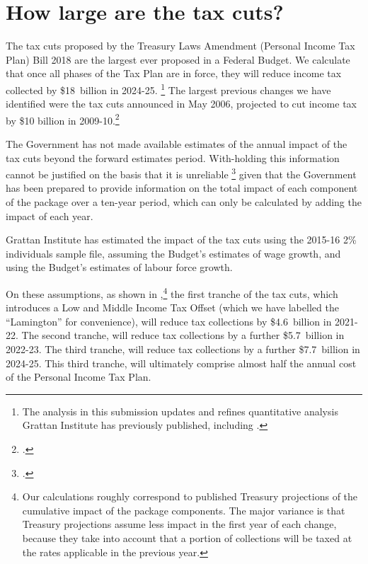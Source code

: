 \documentclass[submission]{grattan}\usepackage[]{graphicx}\usepackage[]{color}
\begin{document}
\chapter{How large are the tax cuts?}\label{chap:how-large-are-the-tax-cuts}

The tax cuts proposed by the Treasury Laws Amendment (Personal Income Tax Plan) Bill 2018 are the largest ever proposed in a Federal Budget. We calculate that once all phases of the Tax Plan are in force, they will reduce income tax collected by \$18~billion in 2024-25.%
  \footnote{The analysis in this submission updates and refines quantitative analysis Grattan Institute has previously published, including \textcite{DaleyWood2018}.}
The largest previous changes we have identified were the tax cuts announced in May 2006, projected to cut income tax by \$10 billion in 2009-10.\footcite[][23]{Treasury2006}

The Government has not made available estimates of the annual impact of the tax cuts beyond the forward estimates period. With-holding this information cannot be justified on the basis that it is unreliable%
  \footcite{Murphy2018}
given that the Government has been prepared to provide information on the total impact of each component of the package over a ten-year period, which can only be calculated by adding the impact of each year.

Grattan Institute has estimated the impact of the tax cuts using the 2015-16 2\% individuals sample file, assuming the Budget's estimates of wage growth, and using the Budget's estimates of labour force growth.

On these assumptions, as shown in  ,\footnote{Our calculations roughly correspond to published Treasury projections of the cumulative impact of the package components. The major variance is that Treasury projections assume less impact in the first year of each change, because they take into account that a portion of collections will be taxed at the rates applicable in the previous year.}
the first tranche of the tax cuts, which introduces a Low and Middle Income Tax Offset (which we have labelled the ``Lamington'' for convenience), will reduce tax collections by \$4.6~billion in 2021-22. The second tranche, will reduce tax collections by a further \$5.7~billion in 2022-23. The third tranche, will reduce tax collections by a further \$7.7~billion in 2024-25. This third tranche, will ultimately comprise almost half the annual cost of the Personal Income Tax Plan.
\end{document}
